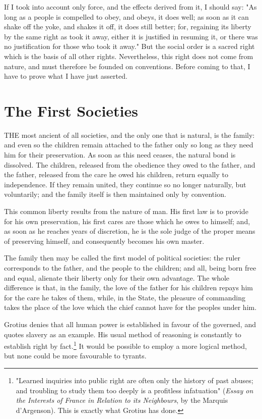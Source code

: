 \documentclass[12pt]{book}
\begin{document}
If I took into account only force, and the effects derived from it, I should say: "As long as a people is compelled to obey, and obeys, it does well; as soon as it can shake off the yoke, and shakes it off, it does still better; for, regaining its liberty by the same right as took it away, either it is justified in resuming it, or there was no justification for those who took it away." But the social order is a sacred right which is the basis of all other rights. Nevertheless, this right does not come from nature, and must therefore be founded on conventions. Before coming to that, I have to prove what I have just asserted.
\section{The First Societies}
THE most ancient of all societies, and the only one that is natural, is the family: and even so the children remain attached to the father only so long as they need him for their preservation. As soon as this need ceases, the natural bond is dissolved. The children, released from the obedience they owed to the father, and the father, released from the care he owed his children, return equally to independence. If they remain united, they continue so no longer naturally, but voluntarily; and the family itself is then maintained only by convention.

This common liberty results from the nature of man. His first law is to provide for his own preservation, his first cares are those which he owes to himself; and, as soon as he reaches years of discretion, he is the sole judge of the proper means of preserving himself, and consequently becomes his own master.

The family then may be called the first model of political societies: the ruler corresponds to the father, and the people to the children; and all, being born free and equal, alienate their liberty only for their own advantage. The whole difference is that, in the family, the love of the father for his children repays him for the care he takes of them, while, in the State, the pleasure of commanding takes the place of the love which the chief cannot have for the peoples under him.

Grotius denies that all human power is established in favour of the governed, and quotes slavery as an example. His usual method of reasoning is constantly to establish right by fact.\footnote{"Learned inquiries into public right are often only the history of past abuses; and troubling to study them too deeply is a profitless infatuation" (\textit{Essay on the Interests of France in Relation to its Neighbours}, by the Marquis d'Argenson). This is exactly what Grotius has done.} It would be possible to employ a more logical method, but none could be more favourable to tyrants.
\end{document}
